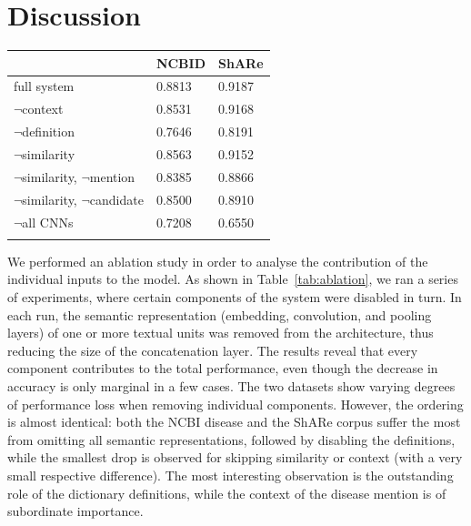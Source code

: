 \documentclass{bioinfo}
\begin{document}
\section{Discussion}

\begin{table}[!t]
{\begin{tabular}{@{}lll@{}}\toprule
                                    & NCBID  & ShARe \\
  \midrule
  full system                       & 0.8813 & 0.9187 \\
  \midrule
  $\neg$context                     & 0.8531 & 0.9168 \\
  $\neg$definition                  & 0.7646 & 0.8191 \\
  \midrule
  $\neg$similarity                  & 0.8563 & 0.9152 \\
  $\neg$similarity, $\neg$mention   & 0.8385 & 0.8866 \\
  $\neg$similarity, $\neg$candidate & 0.8500 & 0.8910 \\
  \midrule
  $\neg$all CNNs                    & 0.7208 & 0.6550 \\
  \botrule
\end{tabular}}{}
\end{table}

We performed an ablation study in order to analyse the contribution of the individual inputs to the model.
As shown in Table~\ref{tab:ablation}, we ran a series of experiments, where certain components of the system were disabled in turn.
In each run, the semantic representation (embedding, convolution, and pooling layers) of one or more textual units was removed from the architecture, thus reducing the size of the concatenation layer.
The results reveal that every component contributes to the total performance, even though the decrease in accuracy is only marginal in a few cases.
The two datasets show varying degrees of performance loss when removing individual components.
However, the ordering is almost identical: both the NCBI disease and the ShARe corpus suffer the most from omitting all semantic representations, followed by disabling the definitions, while the smallest drop is observed for skipping similarity or context (with a very small respective difference).
The most interesting observation is the outstanding role of the dictionary definitions, while the context of the disease mention is of subordinate importance.
\end{document}
